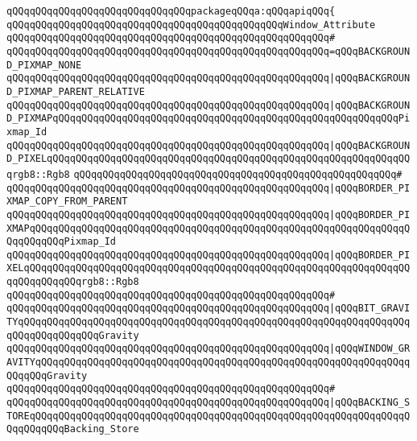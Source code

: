 \verb|qQQqqQQqqQQqqQQqqQQqqQQqqQQqqQQqpackageqQQqa:qQQqapiqQQq{|\newline
\newline
\verb|qQQqqQQqqQQqqQQqqQQqqQQqqQQqqQQqqQQqqQQqqQQqqQQqWindow_Attribute|\newline
\verb|qQQqqQQqqQQqqQQqqQQqqQQqqQQqqQQqqQQqqQQqqQQqqQQqqQQqqQQq#|\newline
\verb|qQQqqQQqqQQqqQQqqQQqqQQqqQQqqQQqqQQqqQQqqQQqqQQqqQQqqQQq=qQQqBACKGROUND_PIXMAP_NONE|\newline
\verb|qQQqqQQqqQQqqQQqqQQqqQQqqQQqqQQqqQQqqQQqqQQqqQQqqQQqqQQq|\verb#|qQQqBACKGROUND_PIXMAP_PARENT_RELATIVE#\newline
\verb|qQQqqQQqqQQqqQQqqQQqqQQqqQQqqQQqqQQqqQQqqQQqqQQqqQQqqQQq|\verb#|qQQqBACKGROUND_PIXMAPqQQqqQQqqQQqqQQqqQQqqQQqqQQqqQQqqQQqqQQqqQQqqQQqqQQqqQQqqQQqPixmap_Id#\newline
\verb|qQQqqQQqqQQqqQQqqQQqqQQqqQQqqQQqqQQqqQQqqQQqqQQqqQQqqQQq|\verb#|qQQqBACKGROUND_PIXELqQQqqQQqqQQqqQQqqQQqqQQqqQQqqQQqqQQqqQQqqQQqqQQqqQQqqQQqqQQqqQQqrgb8::Rgb8#\newline
\verb|qQQqqQQqqQQqqQQqqQQqqQQqqQQqqQQqqQQqqQQqqQQqqQQqqQQqqQQq#|\newline
\verb|qQQqqQQqqQQqqQQqqQQqqQQqqQQqqQQqqQQqqQQqqQQqqQQqqQQqqQQq|\verb#|qQQqBORDER_PIXMAP_COPY_FROM_PARENT#\newline
\verb|qQQqqQQqqQQqqQQqqQQqqQQqqQQqqQQqqQQqqQQqqQQqqQQqqQQqqQQq|\verb#|qQQqBORDER_PIXMAPqQQqqQQqqQQqqQQqqQQqqQQqqQQqqQQqqQQqqQQqqQQqqQQqqQQqqQQqqQQqqQQqqQQqqQQqqQQqPixmap_Id#\newline
\verb|qQQqqQQqqQQqqQQqqQQqqQQqqQQqqQQqqQQqqQQqqQQqqQQqqQQqqQQq|\verb#|qQQqBORDER_PIXELqQQqqQQqqQQqqQQqqQQqqQQqqQQqqQQqqQQqqQQqqQQqqQQqqQQqqQQqqQQqqQQqqQQqqQQqqQQqqQQqrgb8::Rgb8#\newline
\verb|qQQqqQQqqQQqqQQqqQQqqQQqqQQqqQQqqQQqqQQqqQQqqQQqqQQqqQQq#|\newline
\verb|qQQqqQQqqQQqqQQqqQQqqQQqqQQqqQQqqQQqqQQqqQQqqQQqqQQqqQQq|\verb#|qQQqBIT_GRAVITYqQQqqQQqqQQqqQQqqQQqqQQqqQQqqQQqqQQqqQQqqQQqqQQqqQQqqQQqqQQqqQQqqQQqqQQqqQQqqQQqqQQqGravity#\newline
\verb|qQQqqQQqqQQqqQQqqQQqqQQqqQQqqQQqqQQqqQQqqQQqqQQqqQQqqQQq|\verb#|qQQqWINDOW_GRAVITYqQQqqQQqqQQqqQQqqQQqqQQqqQQqqQQqqQQqqQQqqQQqqQQqqQQqqQQqqQQqqQQqqQQqqQQqGravity#\newline
\verb|qQQqqQQqqQQqqQQqqQQqqQQqqQQqqQQqqQQqqQQqqQQqqQQqqQQqqQQq#|\newline
\verb|qQQqqQQqqQQqqQQqqQQqqQQqqQQqqQQqqQQqqQQqqQQqqQQqqQQqqQQq|\verb#|qQQqBACKING_STOREqQQqqQQqqQQqqQQqqQQqqQQqqQQqqQQqqQQqqQQqqQQqqQQqqQQqqQQqqQQqqQQqqQQqqQQqqQQqBacking_Store#\newline
